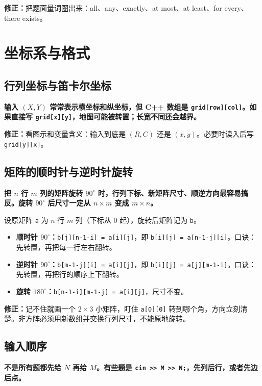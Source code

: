 \documentclass[UTF8,openany,oneside,zihao=-4]{ctexbook}
\newcommand{\risk}[1]{%
  \vspace{0.35em}
  \noindent\colorbox{softred}{%
    \parbox{\dimexpr\linewidth-2\fboxsep}{\textcolor{danger}{\textbf{#1}}}}%
  \vspace{0.35em}
}
\newcommand{\note}[1]{%
  \vspace{0.35em}
  \noindent\colorbox{softblue}{%
    \parbox{\dimexpr\linewidth-2\fboxsep}{\textcolor{ink}{#1}}}%
  \vspace{0.35em}
}
\newcommand{\fix}[1]{%
  \vspace{0.35em}
  \noindent\colorbox{softgreen}{%
    \parbox{\dimexpr\linewidth-2\fboxsep}{\textbf{修正：}#1}}%
  \vspace{0.35em}
}
\newcommand{\term}[1]{\textbf{\textcolor{accenttwo}{#1}}}
\begin{document}
\fix{把题面量词圈出来：all、any、exactly、at most、at least、for every、there exists。}

\section{坐标系与格式}

\subsection{行列坐标与笛卡尔坐标}

\risk{输入 $(X,Y)$ 常常表示横坐标和纵坐标，但 C++ 数组是 \texttt{grid[row][col]}。如果直接写 \texttt{grid[x][y]}，地图可能被转置；长宽不同还会越界。}

\fix{看图示和变量含义：输入到底是 $(R,C)$ 还是 $(x,y)$。必要时读入后写 \texttt{grid[y][x]}。}

\subsection{矩阵的顺时针与逆时针旋转}

\risk{把 $n$ 行 $m$ 列的矩阵旋转 $90^\circ$ 时，行列下标、新矩阵尺寸、顺逆方向最容易搞反。旋转 $90^\circ$ 后尺寸一定从 $n\times m$ 变成 $m\times n$。}

\note{设原矩阵 \texttt{a} 为 $n$ 行 $m$ 列（下标从 $0$ 起），旋转后矩阵记为 \texttt{b}。}

\begin{itemize}
  \item \term{顺时针 $90^\circ$：}\lstinline!b[j][n-1-i] = a[i][j]!，即 \lstinline!b[i][j] = a[n-1-j][i]!。口诀：先转置，再把每一行左右翻转。
  \item \term{逆时针 $90^\circ$：}\lstinline!b[m-1-j][i] = a[i][j]!，即 \lstinline!b[i][j] = a[j][m-1-i]!。口诀：先转置，再把行的顺序上下翻转。
  \item \term{旋转 $180^\circ$：}\lstinline!b[n-1-i][m-1-j] = a[i][j]!，尺寸不变。
\end{itemize}

\fix{记不住就画一个 $2\times 3$ 小矩阵，盯住 \texttt{a[0][0]} 转到哪个角，方向立刻清楚。非方阵必须用新数组并交换行列尺寸，不能原地旋转。}

\subsection{输入顺序}

\risk{不是所有题都先给 $N$ 再给 $M$。有些题是 \texttt{cin >> M >> N;}，先列后行，或者先边后点。}
\end{document}

